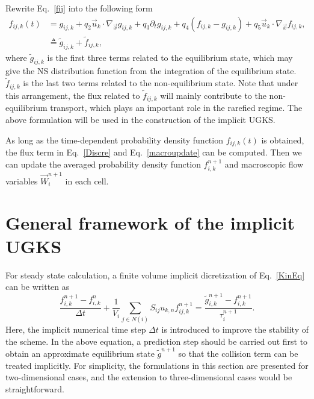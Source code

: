 \documentclass[3p,12pt]{elsarticle}
\begin{document}
	Rewrite Eq.~\eqref{fij} into the following form
	\begin{equation}
		\begin{aligned}
			f_{ij,k}(t) &= g_{ij,k} + q_2 \vec{u}_k \cdot \nabla_{\vec{x}}g_{ij,k} + q_3 \partial _t g_{ij,k} + q_4 \left( f_{ij,k} - g_{ij,k}\right) + q_5  \vec{u}_k \cdot \nabla_{\vec{x}}f_{ij,k},  \\
			& \triangleq \tilde{g}_{ij,k} + \tilde{f}_{ij,k},
		\end{aligned}
		\label{interfaceF}\end{equation}
	where $\tilde{g}_{ij,k}$ is the first three terms related to the equilibrium state, which may give the NS distribution function from the integration of the equilibrium state.  $\tilde{f}_{ij,k}$ is the last two terms related to the non-equilibrium state. Note that under this arrangement, the flux related to $\tilde{f}_{ij,k}$ will mainly contribute to the non-equilibrium transport, which plays an important role in
the rarefied regime. The above formulation will be used in the construction of the implicit UGKS.
	
	As long as the time-dependent probability density function $f_{ij,k}(t)$ is obtained, the flux term in Eq.~\eqref{Discre} and Eq.~\eqref{macroupdate} can be computed. Then we can update the averaged probability density function $f_{i,k}^{n+1}$ and macroscopic flow variables $\vec{W}_i^{n+1}$ in each cell.
	
	\section{General framework of the implicit UGKS}\label{IUGKS}
For steady state calculation, a finite volume implicit dicretization of Eq.~\eqref{KinEq} can be written as
	\begin{equation}
		\frac{f_{i,k}^{n+1} - f_{i,k}^{n}}{\Delta t} + \frac{1}{V_i}\sum_{j\in N(i)}S_{ij}u_{k,n}f_{ij,k}^{n+1} = \frac{\tilde{g}_{i,k}^{n+1} - f_{i,k}^{n+1}}{\tau_i^{n+1}}.
		\label{implicitDis}\end{equation}
	Here, the implicit numerical time step $\Delta t$ is introduced to improve the stability of the scheme.
	In the above equation, a prediction step should be carried out first to obtain an approximate equilibrium state $\tilde{g}^{n+1}$ so that the collision term can be treated implicitly.
	For simplicity, the formulations in this section are presented for two-dimensional cases, and the extension to three-dimensional cases would be straightforward.
	
\end{document}
